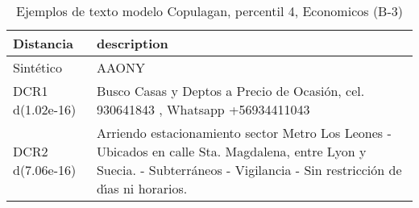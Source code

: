 \begin{table}[H]
\centering
\fontsize{10}{14}\selectfont
\caption{Ejemplos de texto modelo Copulagan, percentil 4, Economicos (B-3)}
\label{table-example-economicos-b-3-copulagan-4p-text}
\begin{tabular}{|l|m{35em}|}
\hline
\rowcolor[gray]{0.8}
Distancia & description \\
\hline Sintético & AAONY \\
\hline DCR1 d(1.02e-16) & Busco Casas y Deptos a Precio de Ocasi\'on, cel. 930641843 , Whatsapp +56934411043  \\
\hline DCR2 d(7.06e-16) & Arriendo estacionamiento sector Metro Los Leones
- Ubicados en calle Sta. Magdalena, entre Lyon y Suecia. 
- Subterr\'aneos
- Vigilancia
- Sin restricci\'on de d{\'\i}as ni horarios.  \\
\hline
\end{tabular}
\end{table}
